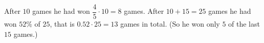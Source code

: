 After $10$ games he had won $\dfrac{4}{5}\cdot10=8$ games. After $10+15=25$ games he had won $52\%$ of $25$, that is $0.52\cdot25=\boxed{13}$ games in total. (So he won only $5$ of the last $15$ games.)

